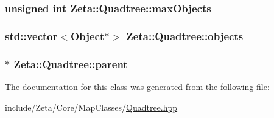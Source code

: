 \hypertarget{classZeta_1_1Quadtree_aa483835272c340ea1b0d5e97f4a6aafa}{
\subsubsection[{max\+Objects}]{\setlength{\rightskip}{0pt plus 5cm}unsigned int Zeta\+::\+Quadtree\+::max\+Objects\hspace{0.3cm}{\ttfamily [private]}}}\label{classZeta_1_1Quadtree_aa483835272c340ea1b0d5e97f4a6aafa}
\hypertarget{classZeta_1_1Quadtree_ab65f2fd401040f96f51fdfb4eb54dcc6}{
\subsubsection[{objects}]{\setlength{\rightskip}{0pt plus 5cm}std\+::vector$<${\bf Object}$\ast$$>$ Zeta\+::\+Quadtree\+::objects\hspace{0.3cm}{\ttfamily [private]}}}\label{classZeta_1_1Quadtree_ab65f2fd401040f96f51fdfb4eb54dcc6}
\hypertarget{classZeta_1_1Quadtree_a27afc304ca92719e0616c388f7e79475}{
\subsubsection[{parent}]{$\ast$ Zeta\+::\+Quadtree\+::parent\hspace{0.3cm}{\ttfamily [private]}}}\label{classZeta_1_1Quadtree_a27afc304ca92719e0616c388f7e79475}


The documentation for this class was generated from the following file\+:\begin{DoxyCompactItemize}
\item 
include/\+Zeta/\+Core/\+Map\+Classes/\hyperlink{Quadtree_8hpp}{Quadtree.\+hpp}\end{DoxyCompactItemize}
